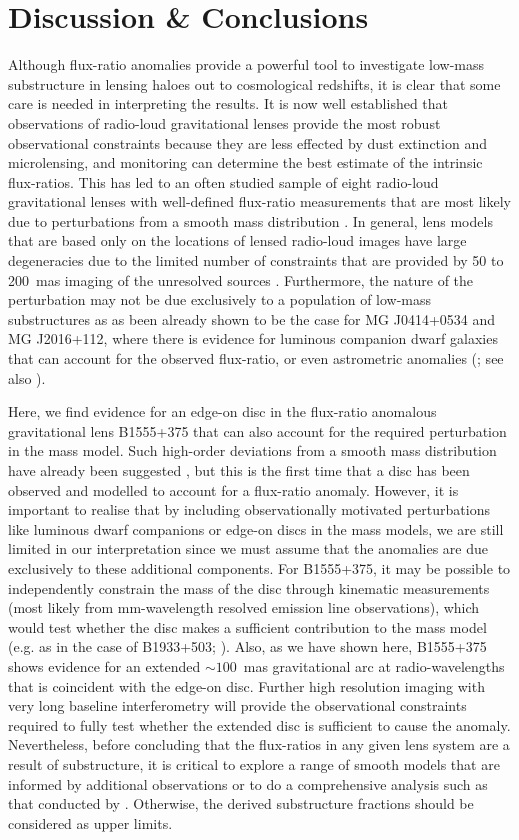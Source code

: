 \documentclass[a4paper,fleqn,usenatbib,useAMS]{mnras}
\begin{document}
\section{Discussion \& Conclusions}

Although flux-ratio anomalies provide a powerful tool to investigate low-mass substructure in lensing haloes out to cosmological redshifts, it is clear that some care is needed in interpreting the results. It is now well established that observations of radio-loud gravitational lenses provide the most robust observational constraints because they are less effected by dust extinction and microlensing, and monitoring can determine the best estimate of the intrinsic flux-ratios. This has led to an often studied sample of eight radio-loud gravitational lenses with well-defined flux-ratio measurements that are most likely due to perturbations from a smooth mass distribution \citep{Xu14}. In general, lens models that are based only on the locations of lensed radio-loud images have large degeneracies due to the limited number of constraints that are provided by 50 to 200~mas imaging of the unresolved sources \citep[e.g.][]{Ka91}. Furthermore, the nature of the perturbation may not be due exclusively to a population of low-mass substructures as as been already shown to be the case for MG J0414+0534 and MG J2016+112, where there is evidence for luminous companion dwarf galaxies that can account for the observed flux-ratio, or even astrometric anomalies (\citealt{ros00,chen07,more09}; see also \citealt{mckean07,jackson10}). 

Here, we find evidence for an edge-on disc in the flux-ratio anomalous gravitational lens B1555+375 that can also account for the required perturbation in the mass model. Such high-order deviations from a smooth mass distribution have already been suggested \citep{evans03,congdon05}, but this is the first time that a disc has been observed and modelled to account for a flux-ratio anomaly. However, it is important to realise that by including observationally motivated perturbations like luminous dwarf companions or edge-on discs in the mass models, we are still limited in our interpretation since we must assume that the anomalies are due exclusively to these additional components. For B1555+375, it may be possible to independently constrain the mass of the disc through kinematic measurements (most likely from mm-wavelength resolved emission line observations), which would test whether the disc makes a sufficient contribution to the mass model (e.g. as in the case of B1933+503; \citealt{suyu12}). Also, as we have shown here, B1555+375 shows evidence for an extended $\sim100$~mas gravitational arc at radio-wavelengths that is coincident with the edge-on disc. Further high resolution imaging with very long baseline interferometry will provide the observational constraints required to fully test whether the extended disc is sufficient to cause the anomaly. Nevertheless, before concluding that the flux-ratios in any given lens system are a result of substructure, it is critical to explore a range of smooth models that are informed by additional observations or to do a comprehensive analysis such as that conducted by \citet{Xu14}. Otherwise, the derived substructure fractions should be considered as upper limits.
\end{document}
